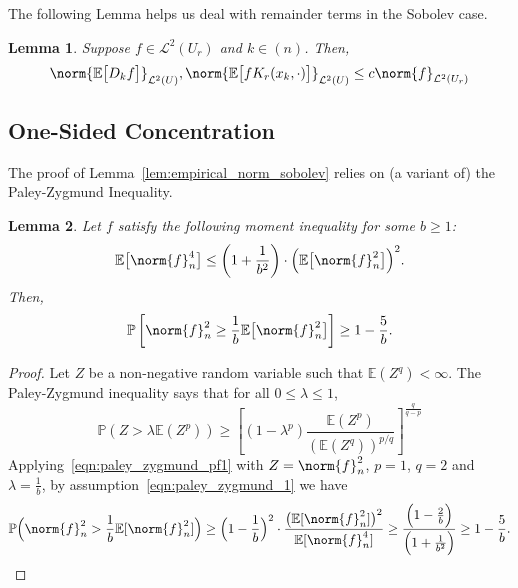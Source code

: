 \documentclass{article}
\newcommand{\1}{\mathbf{1}}
\newcommand{\Leb}{\mathcal{L}}
\newcommand{\Ebb}{\mathbb{E}}
\theoremstyle{alden}
\theoremstyle{aldenthm}
\newtheorem{lemma}{Lemma}
\theoremstyle{definition}
\theoremstyle{remark}
\begin{document}
The following Lemma helps us deal with remainder terms in the Sobolev case.
\begin{lemma}
	\label{lem:remainder_term_sobolev}
	Suppose $f \in \Leb^2(U_r)$ and $k \in (n)$. Then,
	\begin{equation*}
	\norm{\Ebb\bigl[D_kf\bigr]}_{\Leb^2(U)}, \norm{\Ebb\bigl[fK_r(x_k,\cdot)\bigr]}_{\Leb^2(U)} \leq c \norm{f}_{\Leb^2(U_r)}
	\end{equation*}
\end{lemma}

\subsection{One-Sided Concentration}
	
The proof of Lemma~\ref{lem:empirical_norm_sobolev} relies on (a variant of) the Paley-Zygmund Inequality.
\begin{lemma}
	\label{lem:paley_zygmund}
	Let $f$ satisfy the following moment inequality for some $b \geq 1$:
	\begin{equation}
	\label{eqn:paley_zygmund_1}
	\Ebb\bigl[\norm{f}_n^4\bigr] \leq \left(1 + \frac{1}{b^2}\right)\cdot\Bigl(\Ebb\bigl[\norm{f}_n^2\bigr]\Bigr)^2.
	\end{equation}
	Then,
	\begin{equation}
	\label{eqn:paley_zygmund_2}
	\mathbb{P}\left[\norm{f}_n^2 \geq \frac{1}{b} \Ebb\bigl[\norm{f}_n^2\bigr]\right] \geq 1 - \frac{5}{b}.
	\end{equation}
\end{lemma}
\begin{proof}
	Let $Z$ be a non-negative random variable such that $\mathbb{E}(Z^q) < \infty$. The Paley-Zygmund inequality says that for all $0 \leq \lambda \leq 1$,
	\begin{equation}
	\label{eqn:paley_zygmund_pf1}
	\mathbb{P}(Z > \lambda \mathbb{E}(Z^p)) \geq \left[(1 - \lambda^p) \frac{\mathbb{E}(Z^p)}{(\mathbb{E}(Z^q))^{p/q}}\right]^{\frac{q}{q - p}}
	\end{equation}
	Applying~\eqref{eqn:paley_zygmund_pf1} with $Z = \norm{f}_n^2$, $p = 1$, $q = 2$ and $\lambda = \frac{1}{b}$, by assumption~\eqref{eqn:paley_zygmund_1} we have
	\begin{equation*}
	\mathbb{P}\Bigl(\norm{f}_n^2 > \frac{1}{b} \mathbb{E}[\norm{f}_n^2]\Bigr) \geq \Bigl(1 - \frac{1}{b}\Bigr)^2 \cdot  \frac{\bigl(\mathbb{E}[\norm{f}_n^2]\bigr)^2}{\mathbb{E}[\norm{f}_n^4]} \geq \frac{\Bigl(1 - \frac{2}{b}\Bigr)}{\Bigl(1 + \frac{1}{b^2}\Bigr)} \geq 1 - \frac{5}{b}.
	\end{equation*}
\end{proof}
\end{document}
